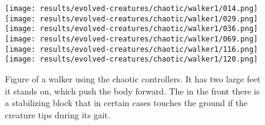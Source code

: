 \documentclass[main]{subfiles}
\begin{document}
\begin{figure}[H]
\centering
\texttt{[image: results/evolved-creatures/chaotic/walker1/014.png]}
\texttt{[image: results/evolved-creatures/chaotic/walker1/029.png]}
\texttt{[image: results/evolved-creatures/chaotic/walker1/036.png]}
\texttt{[image: results/evolved-creatures/chaotic/walker1/069.png]}
\texttt{[image: results/evolved-creatures/chaotic/walker1/116.png]}
\texttt{[image: results/evolved-creatures/chaotic/walker1/120.png]}
\caption[Figure of a walker using sinusoidal controllers.]{Figure of a walker using the chaotic controllers. It has two large feet it stands on, which push the body forward. The in the front there is a stabilizing block that in certain cases touches the ground if the creature tips during its gait.}
\label{figure:successfulcreatures-chaotic-walker1}
\end{figure}
\end{document}
